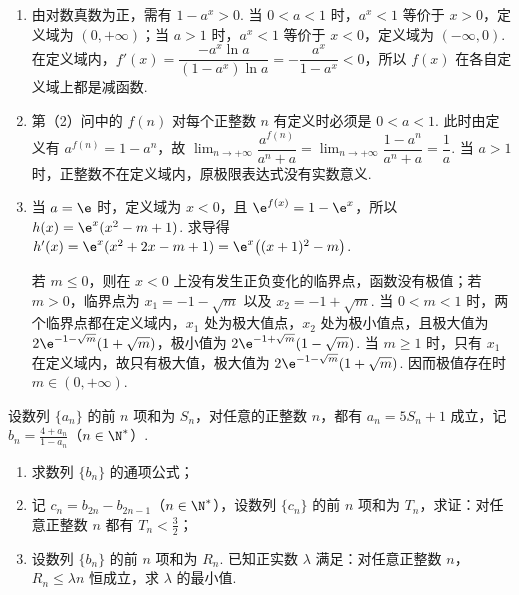 \begin{solution}
\begin{enumerate}
\item 由对数真数为正，需有 \(1-a^x>0\). 当 \(0<a<1\) 时，\(a^x<1\) 等价于 \(x>0\)，定义域为 \((0,+\infty)\)；当 \(a>1\) 时，\(a^x<1\) 等价于 \(x<0\)，定义域为 \((-\infty,0)\). 在定义域内，\(f'(x)=\dfrac{-a^x\ln a}{(1-a^x)\ln a}=-\dfrac{a^x}{1-a^x}<0\)，所以 \(f(x)\) 在各自定义域上都是减函数.
\item 第（2）问中的 \(f(n)\) 对每个正整数 \(n\) 有定义时必须是 \(0<a<1\). 此时由定义有 \(a^{f(n)}=1-a^n\)，故 \(\displaystyle\lim_{n\to+\infty}\dfrac{a^{f(n)}}{a^n+a}=\displaystyle\lim_{n\to+\infty}\dfrac{1-a^n}{a^n+a}=\dfrac1a\). 当 \(a>1\) 时，正整数不在定义域内，原极限表达式没有实数意义.
\item 当 \(a=\e\) 时，定义域为 \(x<0\)，且 \(\e^{f(x)}=1-\e^x\)，所以 \(h(x)=\e^x(x^2-m+1)\). 求导得 \(h'(x)=\e^x(x^2+2x-m+1)=\e^x\bigl((x+1)^2-m\bigr)\).

若 \(m\leqslant0\)，则在 \(x<0\) 上没有发生正负变化的临界点，函数没有极值；若 \(m>0\)，临界点为 \(x_1=-1-\sqrt m\) 以及 \(x_2=-1+\sqrt m\). 当 \(0<m<1\) 时，两个临界点都在定义域内，\(x_1\) 处为极大值点，\(x_2\) 处为极小值点，且极大值为 \(2\e^{-1-\sqrt m}(1+\sqrt m)\)，极小值为 \(2\e^{-1+\sqrt m}(1-\sqrt m)\). 当 \(m\geqslant1\) 时，只有 \(x_1\) 在定义域内，故只有极大值，极大值为 \(2\e^{-1-\sqrt m}(1+\sqrt m)\). 因而极值存在时 \(m\in(0,+\infty)\).
\end{enumerate}
\end{solution}

\begin{problem}
设数列 \(\{a_{n}\}\) 的前 \(n\) 项和为 \(S_{n}\)，对任意的正整数 \(n\)，都有 \(a_{n} = 5S_{n} + 1\) 成立，记 \(b_{n} = \frac{4 + a_{n}}{1 - a_{n}}\)（\(n \in \N^*\)）.

\begin{enumerate}
\item 求数列 \(\{b_{n}\}\) 的通项公式；
\item 记 \(c_{n} = b_{2n} - b_{2n-1}\)（\(n \in \N^*\)），设数列 \(\{c_{n}\}\) 的前 \(n\) 项和为 \(T_{n}\)，求证：对任意正整数 \(n\) 都有 \(T_{n} < \frac{3}{2}\)；
\item 设数列 \(\{b_{n}\}\) 的前 \(n\) 项和为 \(R_{n}\). 已知正实数 \(\lambda\) 满足：对任意正整数 \(n\)，\(R_{n} \leqslant \lambda n\) 恒成立，求 \(\lambda\) 的最小值.
\end{enumerate}
\end{problem}

